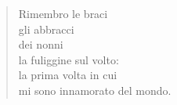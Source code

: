 
\begin{verse}
    Rimembro le braci\\
    gli abbracci\\
    dei nonni\\
    la fuliggine sul volto:\\
    la prima volta in cui\\
    mi sono innamorato del mondo.
\end{verse}